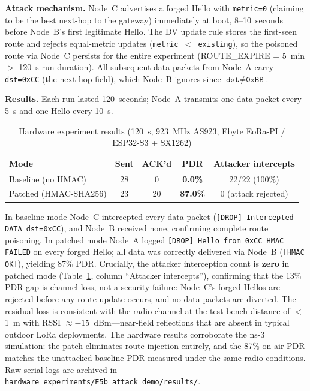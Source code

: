 \documentclass[10pt,journal,compsoc]{IEEEtran}
\begin{document}
\textbf{Attack mechanism.}
Node~C advertises a forged Hello with \texttt{metric=0}
(claiming to be the best next-hop to the gateway)
immediately at boot, 8–10~seconds before Node~B's first
legitimate Hello.
The DV update rule stores the first-seen route and rejects
equal-metric updates (\texttt{metric~$<$~existing}), so the
poisoned route via Node~C persists for the entire experiment
(ROUTE\_EXPIRE = 5~min $>$ 120~s run duration).
All subsequent data packets from Node~A carry
\texttt{dst=0xCC} (the next-hop field), which Node~B ignores
since $\texttt{dst}\neq\texttt{0xBB}$.

\textbf{Results.}
Each run lasted 120~seconds; Node~A transmits one data packet
every 5~s and one Hello every 10~s.

\begin{table}[h]
  \centering
  \caption{Hardware experiment results (120~s, 923~MHz AS923,
           Ebyte EoRa-PI / ESP32-S3 + SX1262)}
  \label{tab:hw-results}
  \begin{tabular}{lcccc}
    \toprule
    \textbf{Mode} & \textbf{Sent} & \textbf{ACK'd} & \textbf{PDR} & \textbf{Attacker intercepts} \\
    \midrule
    Baseline (no HMAC) & 28 & 0  & \textbf{0.0\%}  & 22/22 (100\%) \\
    Patched (HMAC-SHA256)    & 23 & 20 & \textbf{87.0\%} & 0 (attack rejected) \\
    \bottomrule
  \end{tabular}
\end{table}

In baseline mode Node~C intercepted every data packet
(\texttt{[DROP] Intercepted DATA dst=0xCC}), and Node~B
received none, confirming complete route poisoning.
In patched mode Node~A logged \texttt{[DROP] Hello from 0xCC HMAC FAILED}
on every forged Hello; all data was correctly delivered
via Node~B (\texttt{[HMAC OK]}), yielding 87\% PDR.
Crucially, the attacker interception count is \textbf{zero} in patched mode
(Table~\ref{tab:hw-results}, column ``Attacker intercepts''), confirming
that the 13\% PDR gap is channel loss, not a security failure:
Node~C's forged Hellos are rejected before any route update occurs,
and no data packets are diverted.
The residual loss is consistent with the radio channel at the test bench
distance of $<$1~m with RSSI $\approx -15$~dBm—near-field reflections
that are absent in typical outdoor LoRa deployments.
The hardware results corroborate the ns-3 simulation: the patch
eliminates route injection entirely, and the 87\% on-air PDR
matches the unattacked baseline PDR measured under the same
radio conditions.
Raw serial logs are archived in
\texttt{hardware\_experiments/E5b\_attack\_demo/results/}.
\end{document}

